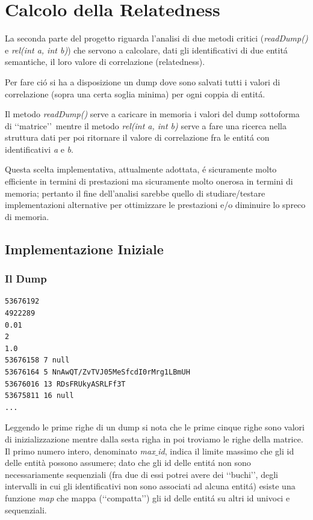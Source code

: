 \chapter{Calcolo della Relatedness}

La seconda parte del progetto riguarda l'analisi di due metodi critici (\textit{readDump()} e \textit{rel(int a, int b)}) che servono a 
calcolare, dati gli identificativi di due entit\'a semantiche, il loro valore di correlazione (relatedness). 

Per fare ci\'o si ha a disposizione un dump dove sono salvati tutti i valori di correlazione (sopra una certa soglia minima) per ogni coppia di entit\'a. 

Il metodo \textit{readDump()} serve a caricare in memoria i valori del dump 
sottoforma di \lq\lq matrice\rq\rq\ mentre il metodo \textit{rel(int a, int b)} serve a fare una ricerca nella struttura dati per poi ritornare il valore di 
correlazione fra le entit\'a con identificativi \textit{a} e \textit{b}.

Questa scelta implementativa, attualmente adottata, \'e sicuramente molto efficiente in termini di prestazioni ma sicuramente molto onerosa in termini di memoria; 
pertanto il fine dell'analisi sarebbe quello di studiare/testare implementazioni alternative per ottimizzare le prestazioni e/o diminuire lo spreco di memoria.  

\section{Implementazione Iniziale}

\subsection{Il Dump}
\begin{lstlisting}[style=TeXStyle]
53676192
4922289
0.01
2
1.0
53676158 7 null
53676164 5 NnAwQT/ZvTVJ05MeSfcdI0rMrg1LBmUH
53676016 13 RDsFRUkyASRLFf3T
53675811 16 null
...
\end{lstlisting}

Leggendo le prime righe di un dump si nota che le prime cinque righe sono valori di inizializzazione mentre dalla sesta righa in poi troviamo le righe della matrice.
Il primo numero intero, denominato \textit{max$\_$id}, indica il limite massimo che gli id delle entità possono assumere; 
dato che gli id delle entit\'a non sono necessariamente sequenziali 
(fra due di essi potrei avere dei \lq\lq buchi\rq\rq, degli intervalli in cui gli identificativi non sono associati ad alcuna entit\'a) 
esiste una funzione \textit{map} che mappa (\lq\lq compatta\rq\rq) gli id delle entit\'a su altri id univoci e sequenziali. 

